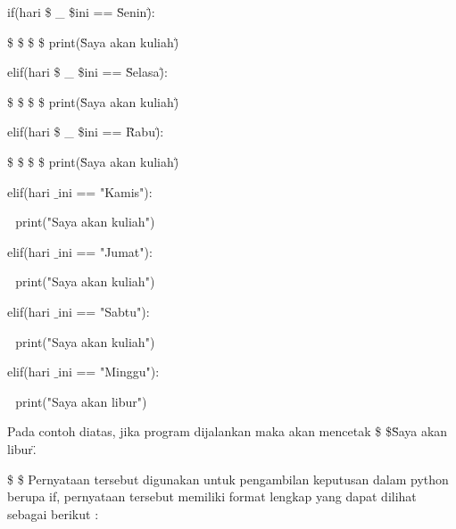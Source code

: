 \vspace{\baselineskip}
if(hari \$  \_  \$ini == \"Senin\"): \par
\noindent 
\vspace{\baselineskip}
 \$  \$  \$  \$ print(\"Saya akan kuliah\") \par
\noindent 
\vspace{\baselineskip}
elif(hari \$  \_  \$ini == \"Selasa\"): \par
\noindent 
\vspace{\baselineskip}
 \$  \$  \$  \$ print(\"Saya akan kuliah\") \par
\noindent 
\vspace{\baselineskip}
elif(hari \$  \_  \$ini == \"Rabu\"): \par
\noindent 
\vspace{\baselineskip}
 \$  \$  \$  \$ print(\"Saya akan kuliah\") \par
\noindent 
\vspace{\baselineskip}
elif(hari $  \_  $ini == "Kamis"): \par
\noindent 
\vspace{\baselineskip}
 $  $  $  $ print("Saya akan kuliah") \par
\noindent 
\vspace{\baselineskip}
elif(hari $  \_  $ini == "Jumat"): \par
\noindent 
\vspace{\baselineskip}
 $  $  $  $ print("Saya akan kuliah") \par
\noindent 
\vspace{\baselineskip}
elif(hari $  \_  $ini == "Sabtu"): \par
\noindent 
\vspace{\baselineskip}
 $  $  $  $ print("Saya akan kuliah") \par
\noindent 
\vspace{\baselineskip}
elif(hari $  \_  $ini == "Minggu"): \par
\noindent 
\vspace{\baselineskip}
 $  $  $  $ print("Saya akan libur") \par
\noindent 
\vspace{\baselineskip}
\vspace{\baselineskip}
Pada contoh diatas, jika program dijalankan maka akan mencetak \$  
\$\"Saya akan libur\". \par
\noindent 
 \$  \$ Pernyataan tersebut digunakan untuk pengambilan keputusan dalam python berupa if, pernyataan tersebut memiliki format lengkap  yang dapat dilihat sebagai berikut : \par
